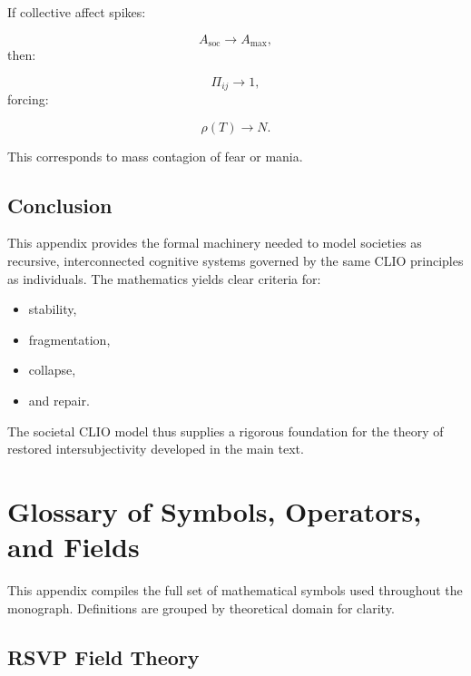 \documentclass[12pt,oneside]{book}
\theoremstyle{plain}
\theoremstyle{definition}
\begin{document}
If collective affect spikes:

\[
A_{\mathrm{soc}} \to A_{\max},
\]
then:

\[
\Pi_{ij} \to 1,
\]
forcing:

\[
\rho(T) \to N.
\]

This corresponds to mass contagion of fear or mania.

\section{Conclusion}

This appendix provides the formal machinery needed to model societies as
recursive, interconnected cognitive systems governed by the same CLIO
principles as individuals. The mathematics yields clear criteria for:

\begin{itemize}
  \item stability,
  \item fragmentation,
  \item collapse,
  \item and repair.
\end{itemize}

The societal CLIO model thus supplies a rigorous foundation for the
theory of restored intersubjectivity developed in the main text.

\chapter{Glossary of Symbols, Operators, and Fields}
\label{app:glossary}

This appendix compiles the full set of mathematical symbols used throughout
the monograph. Definitions are grouped by theoretical domain for clarity.

\section{RSVP Field Theory}
\end{document}
